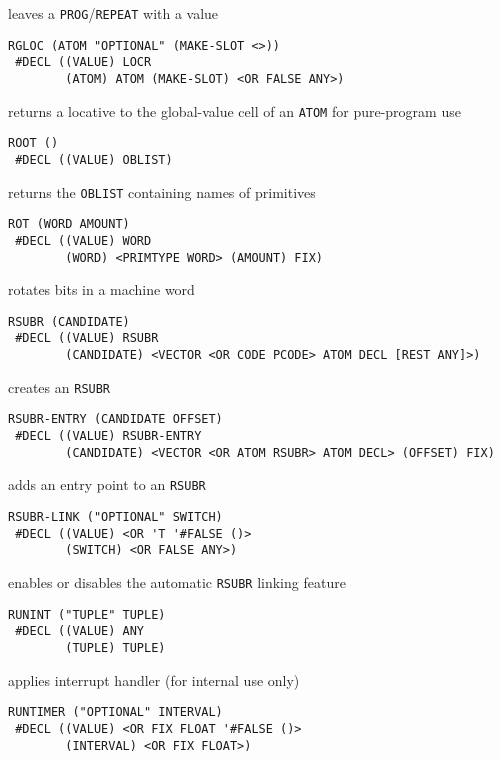 \documentclass[a4paper]{scrbook}
\begin{document}
leaves a \texttt{PROG}/\texttt{REPEAT} with a value

\begin{verbatim}
RGLOC (ATOM "OPTIONAL" (MAKE-SLOT <>))
 #DECL ((VALUE) LOCR
        (ATOM) ATOM (MAKE-SLOT) <OR FALSE ANY>)
\end{verbatim}

returns a locative to the global-value cell of an \texttt{ATOM} for pure-program use

\begin{verbatim}
ROOT ()
 #DECL ((VALUE) OBLIST)
\end{verbatim}

returns the \texttt{OBLIST} containing names of primitives

\begin{verbatim}
ROT (WORD AMOUNT)
 #DECL ((VALUE) WORD
        (WORD) <PRIMTYPE WORD> (AMOUNT) FIX)
\end{verbatim}

rotates bits in a machine word

\begin{verbatim}
RSUBR (CANDIDATE)
 #DECL ((VALUE) RSUBR
        (CANDIDATE) <VECTOR <OR CODE PCODE> ATOM DECL [REST ANY]>)
\end{verbatim}

creates an \texttt{RSUBR}

\begin{verbatim}
RSUBR-ENTRY (CANDIDATE OFFSET)
 #DECL ((VALUE) RSUBR-ENTRY
        (CANDIDATE) <VECTOR <OR ATOM RSUBR> ATOM DECL> (OFFSET) FIX)
\end{verbatim}

adds an entry point to an \texttt{RSUBR}

\begin{verbatim}
RSUBR-LINK ("OPTIONAL" SWITCH)
 #DECL ((VALUE) <OR 'T '#FALSE ()>
        (SWITCH) <OR FALSE ANY>)
\end{verbatim}

enables or disables the automatic \texttt{RSUBR} linking feature

\begin{verbatim}
RUNINT ("TUPLE" TUPLE)
 #DECL ((VALUE) ANY
        (TUPLE) TUPLE)
\end{verbatim}

applies interrupt handler (for internal use only)

\begin{verbatim}
RUNTIMER ("OPTIONAL" INTERVAL)
 #DECL ((VALUE) <OR FIX FLOAT '#FALSE ()>
        (INTERVAL) <OR FIX FLOAT>)
\end{verbatim}
\end{document}
